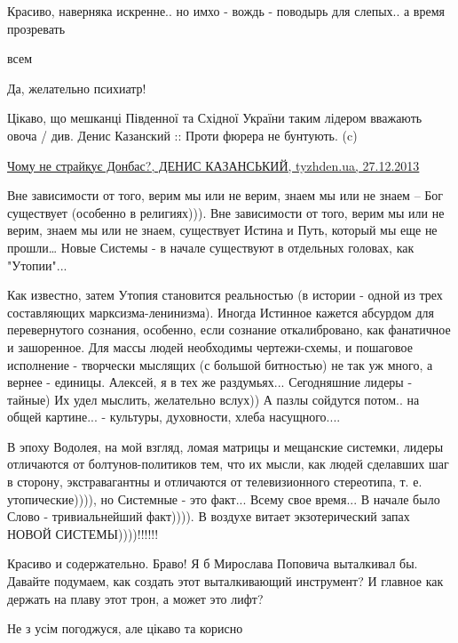 \begin{itemize}
Красиво, наверняка искренне.. но имхо - вождь - поводырь для слепых.. а время прозревать

всем

Да, желательно психиатр!


Цікаво, що мешканці Південної та Східної України таким лідером вважають овоча /
див. Денис Казанский :: Проти фюрера не бунтують. (c) 

\href{http://tyzhden.ua/Society/97204}{%
Чому не страйкує Донбас?, ДЕНИС КАЗАНСЬКИЙ, tyzhden.ua, 27.12.2013%
}


Вне зависимости от того, верим мы или не верим, знаем мы или не знаем – Бог
существует (особенно в религиях))). Вне зависимости от того, верим мы или не
верим, знаем мы или не знаем, существует Истина и Путь, который мы еще не
прошли… Новые Системы - в начале существуют в отдельных головах, как
"Утопии"... 

Как известно, затем Утопия становится реальностью (в истории - одной из трех
составляющих марксизма-ленинизма). Иногда Истинное кажется абсурдом для
перевернутого сознания, особенно, если сознание откалибровано, как фанатичное и
зашоренное. Для массы людей необходимы чертежи-схемы, и пошаговое исполнение -
творчески мыслящих (с большой битностью) не так уж много, а вернее - единицы.
Алексей, я в тех же раздумьях... Сегодняшние лидеры - тайные) Их удел мыслить,
желательно вслух)) А пазлы сойдутся потом.. на общей картине... - культуры,
духовности, хлеба насущного.... 

В эпоху Водолея, на мой взгляд, ломая матрицы и мещанские системки, лидеры
отличаются от болтунов-политиков тем, что их мысли, как людей сделавших шаг в
сторону, экстравагантны и отличаются от телевизионного стереотипа, т. е.
утопические)))), но Системные - это факт...  Всему свое время... В начале было
Слово - тривиальнейший факт)))). В воздухе витает экзотерический запах НОВОЙ
СИСТЕМЫ))))!!!!!!


Красиво и содержательно. Браво! Я б Мирослава Поповича выталкивал бы. Давайте
подумаем, как создать этот выталкивающий инструмент? И главное как держать на
плаву этот трон, а может это лифт?

Не з усім погоджуся, але цікаво та корисно



\end{itemize}
